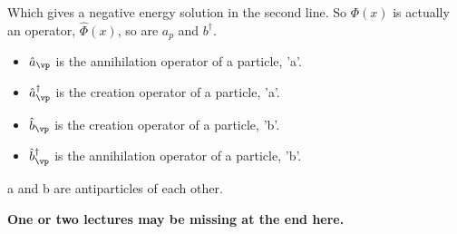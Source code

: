 \documentclass[a4paper, 11pt, normalem]{report}
\begin{document}
Which gives a negative energy solution in the second line.
So $\Phi(x)$ is actually an operator, $\hat{\Phi}(x)$, so are $a_p$ and $b^\dagger$.
\begin{itemize}
    \item $\hat{a}_{\vp}$ is the annihilation operator of a particle, 'a'.
    \item $\hat{a}^{\dagger}_{\vp}$ is the creation operator of a particle, 'a'.
    \item $\hat{b}_{\vp}$ is the creation operator of a particle, 'b'.
    \item $\hat{b}^{\dagger}_{\vp}$ is the annihilation operator of a particle, 'b'.
\end{itemize}
a and b are antiparticles of each other.

\textbf{One or two lectures may be missing at the end here.}
\end{document}
